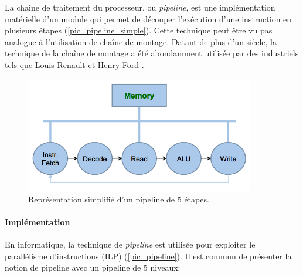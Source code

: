 La chaîne de traitement du processeur, ou \textit{pipeline}, est une implémentation matérielle d'un module qui permet de découper l'exécution d'une instruction en plusieurs étapes (\autoref{pic_pipeline_simple}). Cette technique peut être vu pas analogue à l'utilisation de chaîne de montage. Datant de plus d'un siècle, la technique de la chaîne de montage a été abondamment utilisée par des industriels tels que Louis Renault et Henry Ford \cite{wolff1957entrepreneurs}.



\begin{figure}
    \center
    \includegraphics[width=10cm]{images/Chapitre1/Neumann.png}
    \caption{\label{pic_pipeline_simple} Représentation simplifié d'un pipeline de 5 étapes.}
\end{figure}


\paragraph{Implémentation}

En informatique, la technique de \textit{pipeline} est utilisée pour exploiter le parallélisme d'instructions (ILP) (\autoref{pic_pipeline}). Il est commun de présenter la notion de pipeline avec un pipeline de 5 niveaux:

